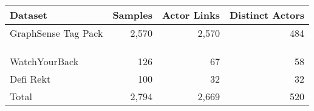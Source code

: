 \begin{tabular*}{\textwidth}{@{\extracolsep{\fill}}lrrr}
    \toprule
    \textbf{Dataset} & \textbf{Samples} & \textbf{Actor Links} & \textbf{Distinct Actors}\\
    \midrule
    GraphSense Tag Pack & 2,570 & 2,570  & 484\\
    \quad \color{gray}{Train} & \color{gray}{25} & \color{gray}{25} & \color{gray}{20}\\
    \quad \color{gray}{Validation} & \color{gray}{771} & \color{gray}{771} & \color{gray}{198}\\
    \quad \color{gray}{Test} & \color{gray}{1,774} & \color{gray}{1,774} & \color{gray}{361}\\
    WatchYourBack & 126 & 67 & 58\\
    Defi Rekt & 100 & 32 & 32\\
    \midrule
    Total & 2,794 & 2,669 & 520\\
    \bottomrule
\end{tabular*}

